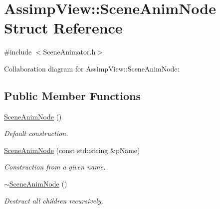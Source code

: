 \hypertarget{struct_assimp_view_1_1_scene_anim_node}{\section{Assimp\+View\+:\+:Scene\+Anim\+Node Struct Reference}
\label{struct_assimp_view_1_1_scene_anim_node}
}


{\ttfamily \#include $<$Scene\+Animator.\+h$>$}



Collaboration diagram for Assimp\+View\+:\+:Scene\+Anim\+Node\+:
\subsection*{Public Member Functions}
\begin{DoxyCompactItemize}
\item 
\hypertarget{struct_assimp_view_1_1_scene_anim_node_a0e5573e544896b94990bd229b5d2a9a0}{\hyperlink{struct_assimp_view_1_1_scene_anim_node_a0e5573e544896b94990bd229b5d2a9a0}{Scene\+Anim\+Node} ()}\label{struct_assimp_view_1_1_scene_anim_node_a0e5573e544896b94990bd229b5d2a9a0}

\begin{DoxyCompactList}\small\item\em Default construction. \end{DoxyCompactList}\item 
\hypertarget{struct_assimp_view_1_1_scene_anim_node_a906843edb5b9bfc13a6f67d4f3f6c39b}{\hyperlink{struct_assimp_view_1_1_scene_anim_node_a906843edb5b9bfc13a6f67d4f3f6c39b}{Scene\+Anim\+Node} (const std\+::string \&p\+Name)}\label{struct_assimp_view_1_1_scene_anim_node_a906843edb5b9bfc13a6f67d4f3f6c39b}

\begin{DoxyCompactList}\small\item\em Construction from a given name. \end{DoxyCompactList}\item 
\hypertarget{struct_assimp_view_1_1_scene_anim_node_ad1a5580a72b84dda7e9d65d9c61f1a2e}{\hyperlink{struct_assimp_view_1_1_scene_anim_node_ad1a5580a72b84dda7e9d65d9c61f1a2e}{$\sim$\+Scene\+Anim\+Node} ()}\label{struct_assimp_view_1_1_scene_anim_node_ad1a5580a72b84dda7e9d65d9c61f1a2e}

\begin{DoxyCompactList}\small\item\em Destruct all children recursively. \end{DoxyCompactList}\end{DoxyCompactItemize}
